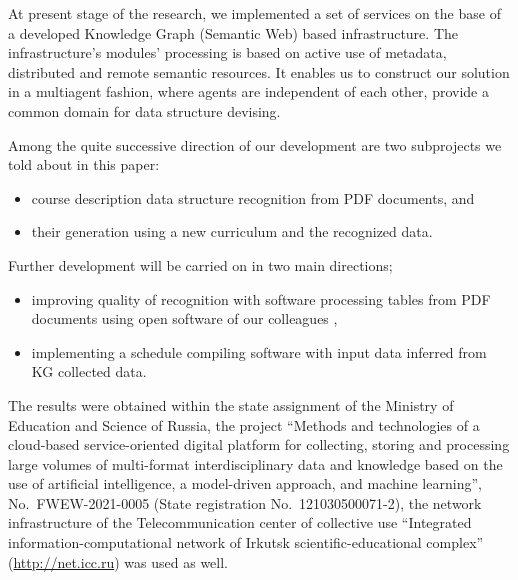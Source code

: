 \documentclass[
]{aiitart}
\begin{document}
At present stage of the research, we implemented a set of services on the base of a developed Knowledge Graph (Semantic Web) based infrastructure.  The infrastructure's modules' processing is based on active use of metadata, distributed and remote semantic resources.  It enables us to construct our solution in a multiagent fashion, where agents are independent of each other, provide a common domain for data structure devising.

Among the quite successive direction of our development are two subprojects we told about in this paper:
\begin{itemize}
    \item course description data structure recognition from PDF documents, and
    \item their generation using a new curriculum and the recognized data.
\end{itemize}
Further development will be carried on in two main directions;
\begin{itemize}
    \item improving quality of recognition with software processing tables from PDF documents using open software of our colleagues \cite{Shigarov_2016,Shigarov_2017},
    \item implementing a schedule compiling software with input data inferred from KG collected data.
\end{itemize}


\begin{acknowledgments}
The results were obtained within the state assignment of the Ministry of Education and Science of Russia, the project ``Methods and technologies of a cloud-based service-oriented digital platform for collecting, storing and processing large volumes of multi-format interdisciplinary data and knowledge based on the use of artificial intelligence, a model-driven approach, and machine learning'', No.~FWEW-2021-0005 (State registration No.~121030500071-2), the network infrastructure of the Telecommunication center of collective use ``Integrated information-computational network of Irkutsk scientific-educational complex'' (\url{http://net.icc.ru}) was used as well.
\end{acknowledgments}
\end{document}
